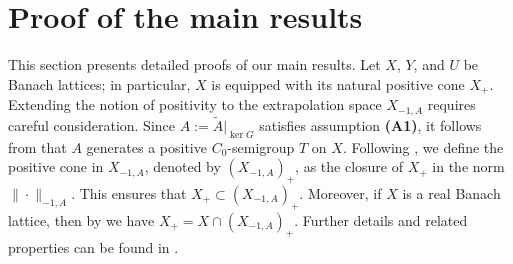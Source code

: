 \documentclass[onecolumn]{autart}
\numberwithin{equation}{section}
\begin{document}
	\section{Proof of the main results}\label{Sec:3}
	This section presents detailed proofs of our main results. Let $X$, $Y$, and $U$ be Banach lattices; in particular, $X$ is equipped with its natural positive cone $X_+$. Extending the notion of positivity to the extrapolation space $X_{-1,A}$ requires careful consideration. Since $A := \tilde{A}|_{\ker G}$ satisfies assumption {\bf (A1)}, it follows from \cite[Thm. 2.5]{Arendt} that $A$ generates a positive $C_0$-semigroup $T$ on $X$. Following \cite[Def. 2.1]{BJVW}, we define the positive cone in $X_{-1,A}$, denoted by $(X_{-1,A})_+$, as the closure of $X_+$ in the norm $\|\cdot\|_{-1,A}$. This ensures that $X_+ \subset (X_{-1,A})_+$. Moreover, if $X$ is a real Banach lattice, then by \cite[Prop. 2.3]{BJVW} we have $	X_+ = X \cap (X_{-1,A})_+$. Further details and related properties can be found in \cite[Sect. 2.2]{SGPS}.
	
\end{document}

